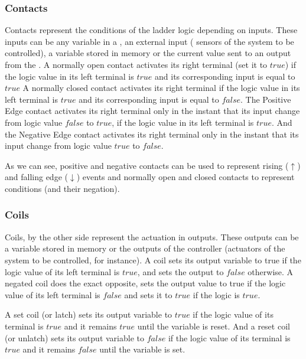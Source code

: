 \subsubsection{Contacts}
Contacts represent the conditions of the ladder logic depending on inputs. These inputs can be any variable in a
\PLC, an external input ( sensors of the system to be controlled), a variable stored in memory or the current
value sent to an output from the \PLC. A normally open contact
activates its right terminal (set it to $true$) if the logic value in its left terminal
is $true$ and its corresponding input is equal to $true$ 
A normally closed contact activates its right terminal if the logic value in its
left terminal is $true$ and its corresponding input is equal to $false$.
The Positive Edge contact activates its right terminal only in the instant that
its input change from logic value $false$ to $true$, if the logic value in its
left terminal is $true$. And the Negative Edge contact activates its right
terminal only in the instant that its input change from logic value $true$ to
$false$.

As we can see, positive and negative contacts can be used to represent rising ($\uparrow$)
and falling edge  ($\downarrow$) events and normally open and closed contacts
to represent conditions (and their negation).

\subsubsection{Coils}

Coils, by the other side represent the actuation in outputs. These
outputs can be a variable stored in memory or the outputs
of the controller (actuators of the system to be controlled, for instance). 
A coil sets its output variable to true if the logic value of its left terminal is $true$,
and sets the output to $false$ otherwise.
A negated coil does the exact opposite, sets the output value to true if the logic
value of its left terminal is $false$ and sets it to $true$ if the logic is
$true$.

A set coil (or latch) sets its output variable to $true$ if the logic value of its
terminal is $true$ and it remains $true$ until the variable is reset.
And a reset coil (or unlatch) sets its output variable to $false$ if the logic
value of its terminal is $true$ and it remains $false$ until the variable is
set.


